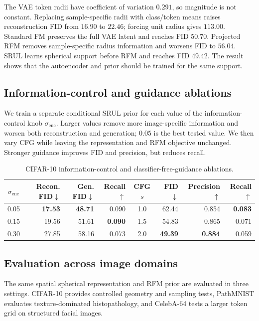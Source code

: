 \documentclass{article}
\begin{document}
The VAE token radii have coefficient of variation $0.291$, so magnitude is not constant. Replacing sample-specific radii with class/token means raises reconstruction FID from $16.90$ to $22.46$; forcing unit radius gives $113.00$. Standard FM preserves the full VAE latent and reaches FID $50.70$. Projected RFM removes sample-specific radius information and worsens FID to $56.04$. SRUL learns spherical support before RFM and reaches FID $49.42$. The result shows that the autoencoder and prior should be trained for the same support.

\subsection*{Information-control and guidance ablations}
We train a separate conditional SRUL prior for each value of the information-control knob $\sigma_{\mathrm{enc}}$. Larger values remove more image-specific information and worsen both reconstruction and generation; $0.05$ is the best tested value. We then vary CFG while leaving the representation and RFM objective unchanged. Stronger guidance improves FID and precision, but reduces recall.

\begin{table}[H]
\centering
\scriptsize
\caption{CIFAR-10 information-control and classifier-free-guidance ablations.}
\label{tab:controls}
\setlength{\tabcolsep}{4.1pt}
\begin{tabular}{crrr|crrr}
\toprule
$\sigma_{\mathrm{enc}}$ & Recon. FID$\downarrow$ & Gen. FID$\downarrow$ & Recall$\uparrow$ & CFG $s$ & FID$\downarrow$ & Precision$\uparrow$ & Recall$\uparrow$ \\
\midrule
0.05 & \textbf{17.53} & \textbf{48.71} & 0.090 & 1.0 & 62.44 & 0.854 & \textbf{0.083} \\
0.15 & 19.56 & 51.61 & \textbf{0.090} & 1.5 & 54.83 & 0.865 & 0.071 \\
0.30 & 27.85 & 58.16 & 0.073 & 2.0 & \textbf{49.39} & \textbf{0.884} & 0.059 \\
\bottomrule
\end{tabular}
\end{table}

\subsection*{Evaluation across image domains}
The same spatial spherical representation and RFM prior are evaluated in three settings. CIFAR-10 provides controlled geometry and sampling tests, PathMNIST evaluates texture-dominated histopathology, and CelebA-64 tests a larger token grid on structured facial images.
\end{document}
